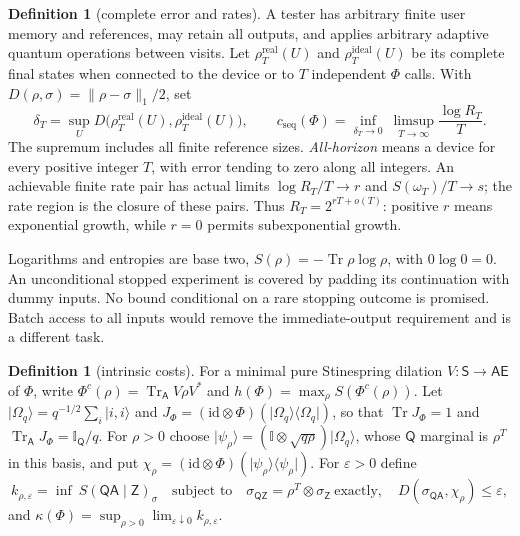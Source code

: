 \documentclass[11pt,a4paper]{article}
\numberwithin{equation}{section}
\theoremstyle{plain}
\theoremstyle{definition}
\newtheorem{definition}[theorem]{Definition}
\DeclareMathOperator{\Tr}{Tr}
\newcommand{\rg}[1]{\mathsf{#1}}
\newcommand{\id}{\mathrm{id}}
\newcommand{\one}{\mathbb{I}}
\newcommand{\Dist}{D}                      %
\newcommand{\cseq}{c_{\mathrm{seq}}}
\newcommand{\ket}[1]{\lvert #1 \rangle}
\newcommand{\ketbra}[2]{\lvert #1 \rangle\langle #2 \rvert}
\begin{document}
\begin{definition}[complete error and rates]
\label{def:complete-error-rates}
A tester has arbitrary finite user memory and references, may retain all
outputs, and applies arbitrary adaptive quantum operations between visits. Let
$\rho_T^{\mathrm{real}}(U)$ and $\rho_T^{\mathrm{ideal}}(U)$ be its complete
final states when connected to the device or to $T$ independent $\Phi$ calls.
With $\Dist(\rho,\sigma)=\lVert\rho-\sigma\rVert_1/2$, set
\begin{equation}
\label{eq:complete-error}
\delta_T=\sup_U \Dist\bigl(\rho_T^{\mathrm{real}}(U),
\rho_T^{\mathrm{ideal}}(U)\bigr),\qquad
\cseq(\Phi)=\inf_{\delta_T\to 0}\ \limsup_{T\to\infty}\frac{\log R_T}{T}.
\end{equation}
The supremum includes all finite reference sizes. \emph{All-horizon} means a
device for every positive integer $T$, with error tending to zero along all
integers. An achievable finite rate pair has actual limits $\log R_T/T\to r$
and $S(\omega_T)/T\to s$; the rate region is the closure of these pairs. Thus
$R_T=2^{rT+o(T)}$: positive $r$ means exponential growth, while $r=0$ permits
subexponential growth.
\end{definition}

Logarithms and entropies are base two, $S(\rho)=-\Tr\rho\log\rho$, with
$0\log 0=0$. An unconditional stopped experiment is covered by padding its
continuation with dummy inputs. No bound conditional on a rare stopping
outcome is promised. Batch access to all inputs would remove the
immediate-output requirement and is a different task.

\begin{definition}[intrinsic costs]
\label{def:intrinsic-costs}
For a minimal pure Stinespring dilation $V:\rg{S}\to\rg{A}\rg{E}$ of $\Phi$,
write $\Phi^c(\rho)=\Tr_{\rg{A}}V\rho V^*$ and
$h(\Phi)=\max_\rho S(\Phi^c(\rho))$. Let
$\ket{\Omega_q}=q^{-1/2}\sum_i\ket{i,i}$ and
$J_\Phi=(\id\otimes\Phi)(\ketbra{\Omega_q}{\Omega_q})$, so that
$\Tr J_\Phi=1$ and $\Tr_{\rg{A}}J_\Phi=\one_{\rg{Q}}/q$. For $\rho>0$ choose
$\ket{\psi_\rho}=(\one\otimes\sqrt{q\rho})\ket{\Omega_q}$, whose $\rg{Q}$
marginal is $\rho^{T}$ in this basis, and put
$\chi_\rho=(\id\otimes\Phi)(\ketbra{\psi_\rho}{\psi_\rho})$. For
$\varepsilon>0$ define
\begin{equation}
\label{eq:kappa-definition}
k_{\rho,\varepsilon}=\inf\ S(\rg{Q}\rg{A}\mid\rg{Z})_\sigma
\quad\text{subject to}\quad
\sigma_{\rg{Q}\rg{Z}}=\rho^{T}\otimes\sigma_{\rg{Z}}\ \text{exactly},\quad
\Dist(\sigma_{\rg{Q}\rg{A}},\chi_\rho)\le\varepsilon,
\end{equation}
and $\kappa(\Phi)=\sup_{\rho>0}\lim_{\varepsilon\downarrow 0}
k_{\rho,\varepsilon}$.
\end{definition}
\end{document}
